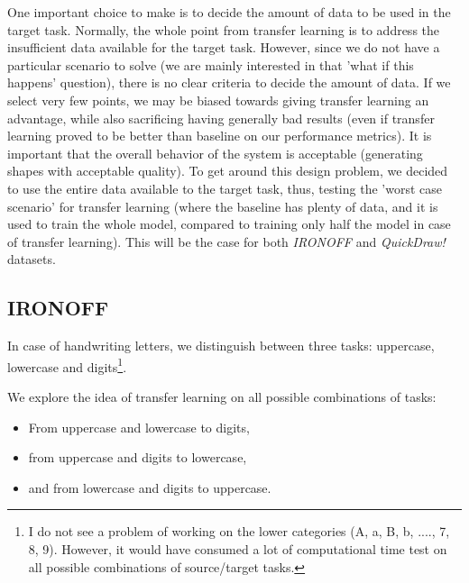   \par One important choice to make is to decide the amount of data to be used in the target task. Normally, the whole point from transfer learning is to address the insufficient data available for the target task. However, since we do not have a particular scenario to solve (we are mainly interested in that 'what if this happens' question), there is no clear criteria to decide the amount of data. If we select very few points, we may be biased towards giving transfer learning an advantage, while also sacrificing having generally bad results (even if transfer learning proved to be better than baseline on our performance metrics). It is important that the overall behavior of the system is acceptable (generating shapes with acceptable quality). To get around this design problem, we decided to use the entire data available to the target task, thus, testing the 'worst case scenario' for transfer learning (where the baseline has plenty of data, and it is used to train the whole model, compared to training only half the model in case of transfer learning). This will be the case for both \textit{IRONOFF} and \textit{QuickDraw!} datasets.

  \subsection{IRONOFF}
    \par In case of handwriting letters, we distinguish between three tasks: uppercase, lowercase and digits\footnote{I do not see a problem of working on the lower categories (A, a, B, b, ...., 7, 8, 9). However, it would have consumed a lot of computational time test on all possible combinations of source/target tasks.}.
    \par We explore the idea of transfer learning on all possible combinations of tasks:
    \begin{itemize}
      \item From uppercase and lowercase to digits,
      \item from uppercase and digits to lowercase,
      \item and from lowercase and digits to uppercase.
    \end{itemize}

